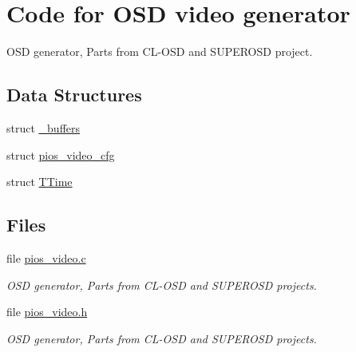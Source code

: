 \hypertarget{group___p_i_o_s___v_i_d_e_o}{\section{\-Code for \-O\-S\-D video generator}
\label{group___p_i_o_s___v_i_d_e_o}
}


\-O\-S\-D generator, \-Parts from \-C\-L-\/\-O\-S\-D and \-S\-U\-P\-E\-R\-O\-S\-D project.  


\subsection*{\-Data \-Structures}
\begin{DoxyCompactItemize}
\item 
struct \hyperlink{struct__buffers}{\-\_\-buffers}
\item 
struct \hyperlink{structpios__video__cfg}{pios\-\_\-video\-\_\-cfg}
\item 
struct \hyperlink{struct_t_time}{\-T\-Time}
\end{DoxyCompactItemize}
\subsection*{\-Files}
\begin{DoxyCompactItemize}
\item 
file \hyperlink{pios__video_8c}{pios\-\_\-video.\-c}
\begin{DoxyCompactList}\small\item\em \-O\-S\-D generator, \-Parts from \-C\-L-\/\-O\-S\-D and \-S\-U\-P\-E\-R\-O\-S\-D projects. \end{DoxyCompactList}\item 
file \hyperlink{pios__video_8h}{pios\-\_\-video.\-h}
\begin{DoxyCompactList}\small\item\em \-O\-S\-D generator, \-Parts from \-C\-L-\/\-O\-S\-D and \-S\-U\-P\-E\-R\-O\-S\-D projects. \end{DoxyCompactList}\end{DoxyCompactItemize}
